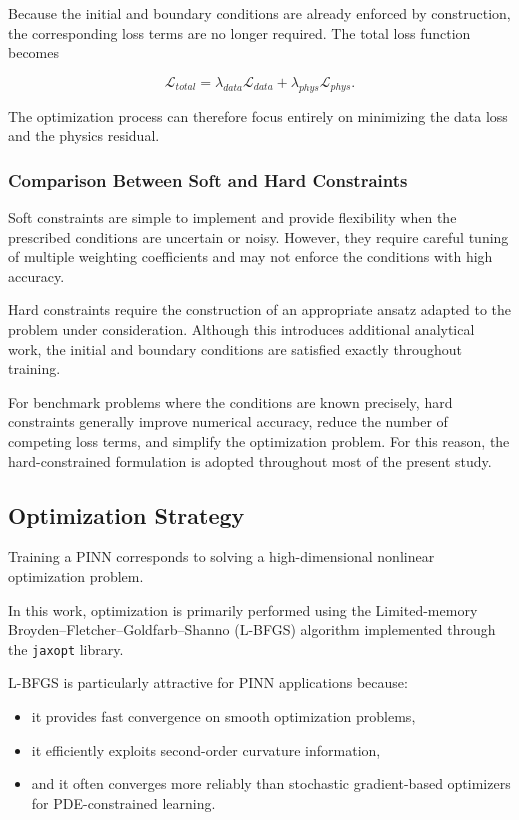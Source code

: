 Because the initial and boundary conditions are already enforced by construction, the corresponding loss terms are no longer required. The total loss function becomes

\begin{equation}
\mathcal{L}_{total} = \lambda_{data}\mathcal{L}_{data} + \lambda_{phys}\mathcal{L}_{phys}.
\end{equation}

The optimization process can therefore focus entirely on minimizing the data loss and the physics residual.

\subsubsection{Comparison Between Soft and Hard Constraints}

Soft constraints are simple to implement and provide flexibility when the prescribed conditions are uncertain or noisy. However, they require careful tuning of multiple weighting coefficients and may not enforce the conditions with high accuracy.

Hard constraints require the construction of an appropriate ansatz adapted to the problem under consideration. Although this introduces additional analytical work, the initial and boundary conditions are satisfied exactly throughout training.

For benchmark problems where the conditions are known precisely, hard constraints generally improve numerical accuracy, reduce the number of competing loss terms, and simplify the optimization problem. For this reason, the hard-constrained formulation is adopted throughout most of the present study.


\subsection{Optimization Strategy}

Training a PINN corresponds to solving a high-dimensional nonlinear optimization problem.

In this work, optimization is primarily performed using the Limited-memory Broyden–Fletcher–Goldfarb–Shanno (L-BFGS) algorithm implemented through the \texttt{jaxopt} library.

L-BFGS is particularly attractive for PINN applications because:
\begin{itemize}
    \item it provides fast convergence on smooth optimization problems,
    \item it efficiently exploits second-order curvature information,
    \item and it often converges more reliably than stochastic gradient-based optimizers for PDE-constrained learning.
\end{itemize}

